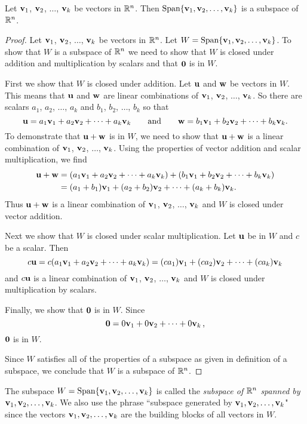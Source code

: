 \begin{theorem} \label{thm:3_a_span_subspace} Let $\mathbf{v}_1$, $\mathbf{v}_2$, $\ldots$, $\mathbf{v}_k$ be vectors in $\mathbb{R}^n$. Then $\text{Span} \{\mathbf{v}_1, \mathbf{v}_2, \ldots, \mathbf{v}_k\}$ is a subspace of $\mathbb{R}^n$.
\end{theorem}

\begin{proof}  Let $\mathbf{v}_1$, $\mathbf{v}_2$, $\ldots$, $\mathbf{v}_k$ be vectors in $\mathbb{R}^n$. Let $W = \text{Span}\{\mathbf{v}_1, \mathbf{v}_2, \ldots, \mathbf{v}_k\}$. To show that $W$ is a subspace of $\mathbb{R}^n$ we need to show that $W$ is closed under addition and multiplication by scalars and that $\mathbf{0}$ is in $W$. 

First we show that $W$ is closed under addition. Let $\mathbf{u}$ and $\mathbf{w}$ be vectors in $W$. This means that $\mathbf{u}$ and $\mathbf{w}$ are linear combinations of $\mathbf{v}_1$, $\mathbf{v}_2$, $\ldots$, $\mathbf{v}_k$. So there are scalars $a_1$, $a_2$, $\ldots$, $a_k$ and $b_1$, $b_2$, $\ldots$, $b_k$ so that
\[\mathbf{u} = a_1\mathbf{v}_1 + a_2\mathbf{v}_2 + \cdots + a_k \mathbf{v}_k \ \ \ \ \ \text{ and } \ \ \ \ \ \mathbf{w} = b_1\mathbf{v}_1 + b_2\mathbf{v}_2 + \cdots + b_k \mathbf{v}_k.\]
To demonstrate that $\mathbf{u} + \mathbf{w}$ is in $W$, we need to show that $\mathbf{u} + \mathbf{w}$ is a linear combination of $\mathbf{v}_1$, $\mathbf{v}_2$, $\ldots$, $\mathbf{v}_k$. Using the properties of vector addition and scalar multiplication, we find
\begin{align*}
\mathbf{u} + \mathbf{w} &= (a_1\mathbf{v}_1 + a_2\mathbf{v}_2 + \cdots + a_k \mathbf{v}_k) + (b_1\mathbf{v}_1 + b_2\mathbf{v}_2 + \cdots + b_k \mathbf{v}_k) \\
    &= (a_1+b_1)\mathbf{v}_1 + (a_2+b_2)\mathbf{v}_2 + \cdots + (a_k+b_k) \mathbf{v}_k.
\end{align*}
Thus $\mathbf{u} + \mathbf{w}$ is a linear combination of $\mathbf{v}_1$, $\mathbf{v}_2$, $\ldots$, $\mathbf{v}_k$ and $W$ is closed under vector addition.

Next we show that $W$ is closed under scalar multiplication. Let $\mathbf{u}$ be in $W$ and $c$ be a scalar. Then
\[c\mathbf{u} = c(a_1\mathbf{v}_1 + a_2\mathbf{v}_2 + \cdots + a_k \mathbf{v}_k) = (ca_1)\mathbf{v}_1 + (ca_2)\mathbf{v}_2 + \cdots + (ca_k) \mathbf{v}_k\]
and $c\mathbf{u}$ is a linear combination of $\mathbf{v}_1$, $\mathbf{v}_2$, $\ldots$, $\mathbf{v}_k$ and $W$ is closed under multiplication by scalars.

Finally, we show that $\mathbf{0}$ is in $W$. Since 
\[\mathbf{0} = 0\mathbf{v}_1 + 0\mathbf{v}_2 + \cdots + 0 \mathbf{v}_k \, , \]
$\mathbf{0}$ is in $W$.

Since $W$ satisfies all of the properties of a subspace as given in definition of a subspace, we conclude that $W$ is a subspace of $\mathbb{R}^n$.
\end{proof}

The subspace $W=\text{Span}\{\mathbf{v}_1, \mathbf{v}_2, \ldots, \mathbf{v}_k\}$ is called the \emph{subspace of $\mathbb{R}^n$ spanned by $\mathbf{v}_1, \mathbf{v}_2, \ldots, \mathbf{v}_k$}. We also use the phrase ``subspace generated by $\mathbf{v}_1, \mathbf{v}_2, \ldots, \mathbf{v}_k$" since the vectors $\mathbf{v}_1, \mathbf{v}_2, \ldots, \mathbf{v}_k$ are the building blocks of all vectors in $W$.



